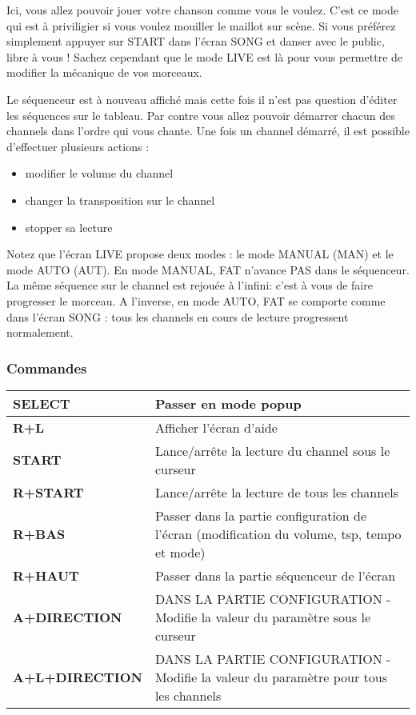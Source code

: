 Ici, vous allez pouvoir jouer votre chanson comme vous le voulez.
C'est ce mode qui est à priviligier si vous voulez mouiller le maillot sur scène.
Si vous préférez simplement appuyer sur START dans l'écran SONG et danser avec le public, libre à vous !
Sachez cependant que le mode LIVE est là pour vous permettre de modifier la mécanique de vos morceaux.


Le séquenceur est à nouveau affiché mais cette fois il n'est pas question d'éditer les séquences sur le tableau.
Par contre vous allez pouvoir démarrer chacun des channels dans l'ordre qui vous chante.
Une fois un channel démarré, il est possible d'effectuer plusieurs actions :
\medskip

\begin{itemize}
    \item{modifier le volume du channel}
    \item{changer la transposition sur le channel}
    \item{stopper sa lecture}
\end{itemize}
\medskip

Notez que l'écran LIVE propose deux modes : le mode MANUAL (MAN) et le mode AUTO (AUT).
En mode MANUAL, FAT n'avance PAS dans le séquenceur. La même séquence sur le channel est rejouée à l'infini: c'est à vous de faire progresser le morceau.
A l'inverse, en mode AUTO, FAT se comporte comme dans l'écran SONG : tous les channels en cours de lecture progressent normalement.
\newpage %
\subsubsection{Commandes}
\begin{supertabular}{|l|p{10cm}|}
    \hline
    {\bf SELECT} & Passer en mode popup \\
    \hline
    {\bf R+L} & Afficher l'écran d'aide \\
    \hline
    {\bf START} & Lance/arrête la lecture du channel sous le curseur \\
    \hline
    {\bf R+START} & Lance/arrête la lecture de tous les channels \\
    \hline
    {\bf R+BAS} & Passer dans la partie configuration de l'écran (modification du volume, tsp, tempo et mode) \\
    \hline
    {\bf R+HAUT} & Passer dans la partie séquenceur de l'écran \\
    \hline
    {\bf A+DIRECTION} & DANS LA PARTIE CONFIGURATION - Modifie la valeur du paramètre sous le curseur \\
    \hline
    {\bf A+L+DIRECTION} & DANS LA PARTIE CONFIGURATION - Modifie la valeur du paramètre pour tous les channels \\
    \hline
\end{supertabular}

